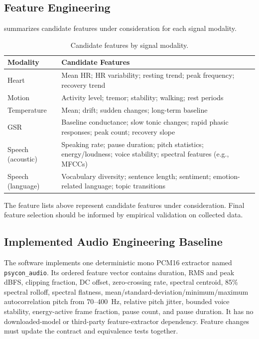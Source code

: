 \subsection{Feature Engineering}
\label{sec:feature-engineering}

 summarizes candidate features under consideration for each signal modality.

\begin{table}[t]
\centering
\caption{Candidate features by signal modality.}
\label{tab:feature-engineering}
\small
\begin{tabularx}{\textwidth}{@{}l Y@{}}
\toprule
\textbf{Modality} & \textbf{Candidate Features} \\
\midrule
Heart & Mean HR; HR variability; resting trend; peak frequency; recovery trend \\
Motion & Activity level; tremor; stability; walking; rest periods \\
Temperature & Mean; drift; sudden changes; long-term baseline \\
GSR & Baseline conductance; slow tonic changes; rapid phasic responses; peak count; recovery slope \\
Speech (acoustic) & Speaking rate; pause duration; pitch statistics; energy/loudness; voice stability; spectral features (e.g., MFCCs) \\
Speech (language) & Vocabulary diversity; sentence length; sentiment; emotion-related language; topic transitions \\
\bottomrule
\end{tabularx}
\end{table}

\begin{researchnote}
The feature lists above represent candidate features under consideration. Final feature selection should be informed by empirical validation on collected data.
\end{researchnote}

\subsection{Implemented Audio Engineering Baseline}
\label{sec:implemented-audio-baseline}

The software implements one deterministic mono PCM16 extractor named \texttt{psycon\_audio}. Its ordered feature vector contains duration, RMS and peak dBFS, clipping fraction, DC offset, zero-crossing rate, spectral centroid, 85\% spectral rolloff, spectral flatness, mean/standard-deviation/minimum/maximum autocorrelation pitch from 70--400~Hz, relative pitch jitter, bounded voice stability, energy-active frame fraction, pause count, and pause duration. It has no downloaded-model or third-party feature-extractor dependency. Feature changes must update the contract and equivalence tests together.

